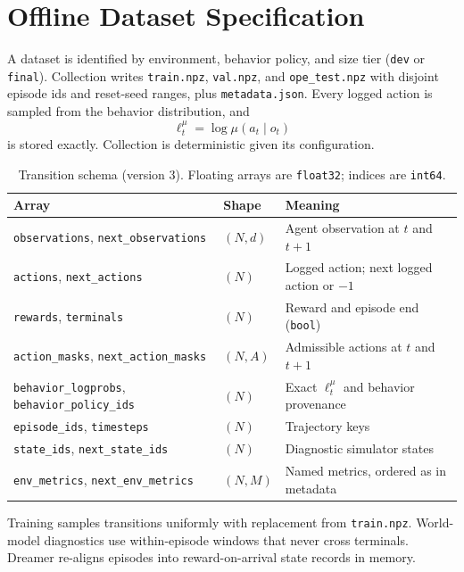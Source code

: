 \documentclass[10pt,twocolumn]{article}
\newcommand{\code}[1]{\texttt{#1}}
\newcommand{\behavior}{\mu}
\begin{document}
\section{Offline Dataset Specification}
\label{sec:data}

A dataset is identified by environment, behavior policy, and size tier (\code{dev} or \code{final}). Collection writes \code{train.npz}, \code{val.npz}, and \code{ope\_test.npz} with disjoint episode ids and reset-seed ranges, plus \code{metadata.json}. Every logged action is sampled from the behavior distribution, and
\begin{equation}
    \ell_t^{\behavior}=\log\behavior(a_t\mid o_t)
\end{equation}
is stored exactly. Collection is deterministic given its configuration.

\begin{table}[t]
\centering
\caption{Transition schema (version 3). Floating arrays are \code{float32}; indices are \code{int64}.}
\label{tab:schema}
\small
\begin{tabularx}{\textwidth}{llX}
\toprule
Array & Shape & Meaning \\
\midrule
\code{observations}, \code{next\_observations} & $(N,d)$ & Agent observation at $t$ and $t+1$ \\
\code{actions}, \code{next\_actions} & $(N)$ & Logged action; next logged action or $-1$ \\
\code{rewards}, \code{terminals} & $(N)$ & Reward and episode end (\code{bool}) \\
\code{action\_masks}, \code{next\_action\_masks} & $(N,A)$ & Admissible actions at $t$ and $t+1$ \\
\code{behavior\_logprobs}, \code{behavior\_policy\_ids} & $(N)$ & Exact $\ell_t^{\behavior}$ and behavior provenance \\
\code{episode\_ids}, \code{timesteps} & $(N)$ & Trajectory keys \\
\code{state\_ids}, \code{next\_state\_ids} & $(N)$ & Diagnostic simulator states \\
\code{env\_metrics}, \code{next\_env\_metrics} & $(N,M)$ & Named metrics, ordered as in metadata \\
\bottomrule
\end{tabularx}
\end{table}

Training samples transitions uniformly with replacement from \code{train.npz}. World-model diagnostics use within-episode windows that never cross terminals. Dreamer re-aligns episodes into reward-on-arrival state records in memory.
\end{document}
